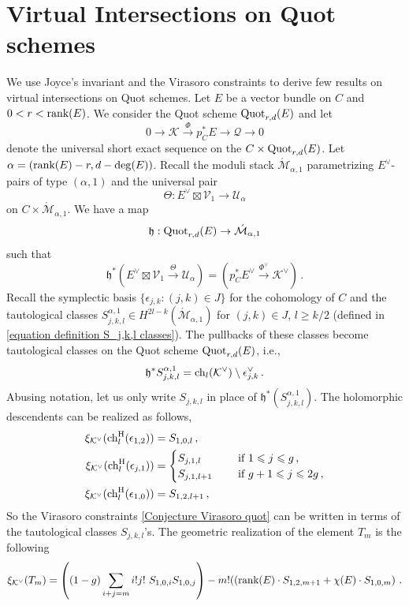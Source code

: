 \documentclass[11pt]{amsart}
\theoremstyle{remark}
\newcommand{\e}{\epsilon}
\newcommand{\Q}{\mathcal{Q}}
\newcommand{\ch}{{\rm ch}}
\newcommand{\mf}[1]{\mathfrak{#1}}
\newcommand{\Mdash}{\acute{\mathcal{M}}}
\newcommand{\U}{\mathcal{U}}
\newcommand{\K}{\mathcal{K}}
\newcommand{\V}{\mathcal{V}}
\newcommand{\rk}{\textnormal{rank}}
\newcommand{\quot}[0]{\textnormal{Quot}}
\newcommand{\chh}[0]{\textnormal{ch}^\textnormal{H}}
\numberwithin{theorem}{section}
\begin{document}
\section{Virtual Intersections on Quot schemes}\label{section intersection theory}
We use Joyce's invariant and the Virasoro constraints to derive few results on virtual intersections on Quot schemes.
Let $E$ be a vector bundle on $C$ and $0<r<\rk(E)$.
We consider the Quot scheme $\quot_{r,d}(E)$ and let 
$$ 0 \to \K \xrightarrow{\Phi} p_C^*E \to \Q \to 0$$
denote the universal short exact sequence on the $C \times \quot_{r,d}(E)$.
Let $\alpha=(\rk(E)-r,d-\deg(E))$.
Recall the moduli stack $\Mdash_{\alpha,1}$ parametrizing $E^\vee$-pairs of type $(\alpha,1)$
and the universal pair
$$ \Theta: E^\vee \boxtimes \V_1 \to \U_\alpha$$
on $C \times \Mdash_{\alpha,1}$.
We have a map 
$$\mf h : \quot_{r,d}(E) \to \Mdash_{\alpha,1}$$
such that 
$$\mf h^*(E^\vee \boxtimes \V_1 \xrightarrow{\Theta} \U_{\alpha}) = \left(p_C^*E^\vee \xrightarrow{\Phi^\vee} \K^\vee \right) \,.$$
Recall the symplectic basis $\{\e_{j,k} : (j,k) \in J \}$
for the cohomology of $C$ 
and the tautological classes
$S^{\alpha,1}_{j,k,l} \in H^{2l-k}(\Mdash_{\alpha,1})$ 
for $(j,k) \in J$, $l \geqslant k/2$ (defined in \eqref{equation definition S_j,k,l classes}).
The pullbacks of these classes become tautological classes on the Quot scheme $\quot_{r,d}(E)$,
i.e.,
$$ \mf h^*S^{\alpha,1}_{j,k,l} = \ch_l(\K^\vee)\setminus \e_{j,k}^\vee\,.$$
Abusing notation, let us only write $S_{j,k,l}$ in place of
$\mf h^*(S^{\alpha,1}_{j,k,l})$.
The holomorphic descendents can be realized as follows,
\begin{align*}
    \xi_{\K^\vee}(\chh_l(\e_{1,2})) &= S_{1,0,l}\,,\\
    \xi_{\K^\vee}(\chh_l(\e_{j,1})) &=  \begin{cases}
         S_{j,1,l} \quad &\textnormal{ if } 1 \leqslant j \leqslant g \,,\\
         S_{j,1,l+1} \quad &\textnormal{ if } g+1 \leqslant j \leqslant 2g \,,
    \end{cases}\\
    \xi_{\K^\vee}(\chh_l(\e_{1,0})) &= S_{1,2,l+1}\,,
\end{align*}
So the Virasoro constraints \eqref{Conjecture Virasoro quot} can be written in terms of the tautological classes $S_{j,k,l}$'s. 
The geometric realization of the element $T_m$ is the following
\begin{equation*}
    \xi_{\K^\vee}(T_m) = \left( (1-g)\sum_{i+j=m}i!j!\ S_{1,0,i}S_{1,0,j} \right)- m!(\left(\rk(E) \cdot S_{1,2,m+1} + \chi(E) \cdot S_{1,0,m} \right)\,.
\end{equation*}
\end{document}
